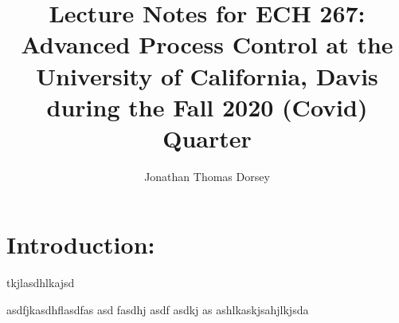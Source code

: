\documentclass[a4paper, twocolumn, 12 pt]{article}
\begin{document}
\title{Lecture Notes for ECH 267: Advanced Process Control at the University of California, Davis during the Fall 2020 (Covid) Quarter}
\author{ Jonathan Thomas Dorsey}



\section{Introduction:}
tkjlasdhlkajsd


asdfjkasdhflasdfas  asd fasdhj asdf asdkj as ashlkaskjsahjlkjsda
\end{document}

